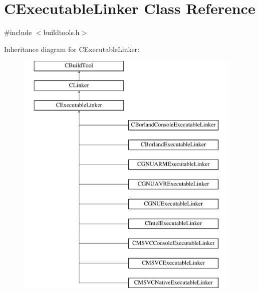 \hypertarget{classCExecutableLinker}{\section{C\-Executable\-Linker Class Reference}
\label{classCExecutableLinker}
}


{\ttfamily \#include $<$buildtools.\-h$>$}

Inheritance diagram for C\-Executable\-Linker\-:\begin{figure}[H]
\begin{center}
\leavevmode
\includegraphics[height=12.000000cm]{d5/d2f/classCExecutableLinker}
\end{center}
\end{figure}
